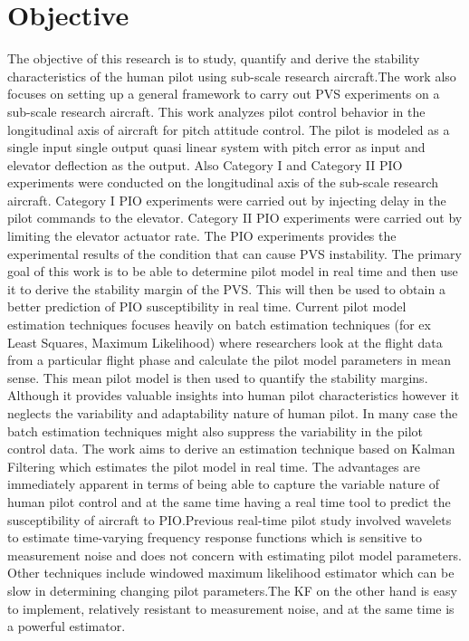 \section{Objective}
\doublespacing
\par The objective of this research is to study, quantify and derive the stability characteristics of the human pilot using sub-scale research aircraft.The work also focuses on setting up a general framework to carry out PVS experiments on a sub-scale research aircraft. This work analyzes pilot control behavior in the longitudinal axis of aircraft for pitch attitude control. The pilot is modeled as a single input single output quasi linear system with pitch error as input and elevator deflection as the output. Also Category I and Category II PIO experiments were conducted on the longitudinal axis of the sub-scale research aircraft. Category I PIO experiments were carried out by injecting delay in the pilot commands to the elevator. Category II PIO experiments were carried out by limiting the elevator actuator rate. The PIO experiments provides the experimental results of the condition that can cause PVS instability. The primary goal of this work is to be able to determine pilot model in real time and then use it to derive the stability margin of the PVS. This will then be used to obtain a  better prediction of PIO susceptibility in real time. Current pilot model estimation techniques focuses heavily on batch estimation techniques (for ex Least Squares, Maximum Likelihood)\cite{pool2009pilot}\cite{mandalpilot}\cite{van1979identification} where researchers look at the flight data from a particular flight phase and calculate the pilot model parameters in mean sense. This mean pilot model is then used to quantify the stability margins. Although it provides valuable insights into human pilot characteristics however it neglects the variability and adaptability nature of human pilot. In many case the batch estimation techniques might also suppress the variability in the pilot control data. The work aims to derive an estimation technique based on Kalman Filtering which estimates the pilot model in real time. The advantages are immediately apparent in terms of being able to capture the variable nature of human pilot control and at the same time having a real time tool to predict the susceptibility of aircraft to PIO.Previous real-time pilot  study involved wavelets\cite{thompson2001wavelet} to estimate time-varying frequency response  functions which is sensitive to  measurement noise\cite{zaal2011estimation} and does  not  concern with estimating pilot model parameters. Other techniques include windowed maximum likelihood\cite{zaal2011estimation} estimator which can be slow in determining changing pilot parameters.The KF  on  the  other  hand  is  easy  to  implement,  relatively  resistant  to  measurement  noise,  and  at  the  same  time  is  a powerful estimator. 

